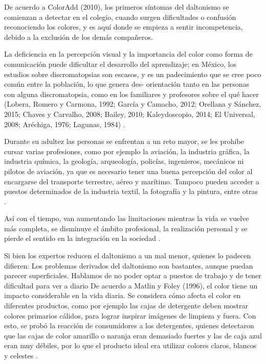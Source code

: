 \documentclass[10pt]{article}
\begin{document}
De acuerdo a ColorAdd (2010), los primeros síntomas del daltonismo se comienzan a detectar en el colegio, cuando surgen dificultades o confusión reconociendo los colores, y es aquí donde se empieza a sentir incompetencia, debido a la exclusión de los demás compañeros\cite{IEEEreferencias:Ref32}.

La deficiencia en la percepción visual y la importancia del color como forma de comunicación puede dificultar el desarrollo del aprendizaje; en México, los estudios sobre discromatopsias son escasos, y es un padecimiento que se cree poco común entre la población, lo que genera des- orientación tanto en las personas con alguna discromatopsia, como en los familiares y profesores sobre el qué hacer (Lobera, Romero y Carmona, 1992; García y Camacho, 2012; Orellana y Sánchez, 2015; Chaves y Carvalho, 2008; Bailey, 2010; Kaleydoscopio, 2014; El Universal, 2008; Aréchiga, 1976; Lagunas, 1984) \cite{IEEEreferencias:Ref27}.

Durante su adultez las personas se enfrentan a un reto mayor, se les prohíbe cursar varias profesiones, como por ejemplo la aviación, la industria gráfica, la industria química, la geología, arqueología, policías, ingenieros, mecánicos ni pilotos de aviación, ya que es necesario tener una buena percepción del color al encargarse del transporte terrestre, aéreo y marítimo. Tampoco pueden acceder a puestos determinados de la industria textil, la fotografía y la pintura, entre otras \cite{IEEEreferencias:Ref32}\cite{IEEEreferencias:Ref1}.

Así con el tiempo, van aumentando las limitaciones mientras la vida se vuelve más completa, se disminuye el ámbito profesional, la realización personal y se pierde el sentido en la integración en la sociedad \cite{IEEEreferencias:Ref32}.

Si bien los expertos reducen el daltonismo a un mal menor, quienes lo padecen difieren: Los problemas derivados del daltonismo son bastantes, aunque puedan parecer superficiales. Hablamos de no poder optar a puestos de trabajo y de tener dificultad para ver a diario \cite{IEEEreferencias:Ref1}
De acuerdo a Matlin y Foley (1996), el color tiene un impacto considerable en la vida diaria. Se considera cómo afecta el color en diferentes productos, como por ejemplo las cajas de detergente deben mostrar colores primarios cálidos, para lograr inspirar imágenes de limpieza y fuera. Con esto, se probó la reacción de consumidores a los detergentes, quienes detectaron que las cajas de color amarillo o naranja eran demasiado fuertes y las de caja azul eran muy débiles, por lo que el producto ideal era utilizar colores claros, blancos y celestes \cite{IEEEreferencias:Ref32}.
\end{document}
